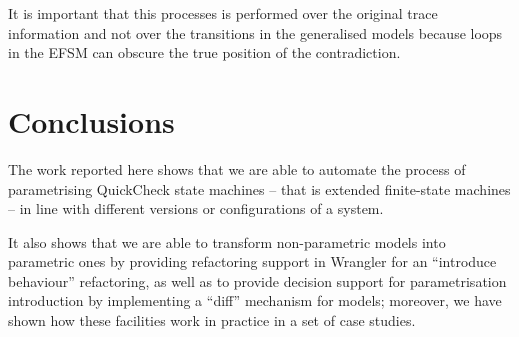 It is important that this processes is performed over the original trace information and not over the transitions in the generalised models because loops in the EFSM can obscure the true position of the contradiction.

\section{Conclusions}
\label{concs}

The work reported here shows that we are able to automate the process of parametrising QuickCheck state machines -- that 
is extended finite-state machines -- in line with different versions or configurations of a system.

It also shows that we are able to transform non-parametric models into parametric ones by providing refactoring support in Wrangler for an ``introduce behaviour'' refactoring, as well as to provide decision support for parametrisation introduction by implementing a ``diff'' mechanism for models; moreover, we have shown how these facilities work in practice in a set of case studies.

